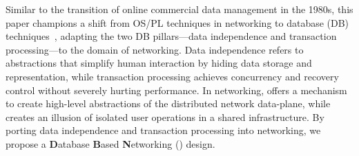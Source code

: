 Similar to the transition of online commercial data management in the
1980s, this paper champions a shift from OS/PL techniques in
networking to database (DB)
techniques~\cite{Abiteboul:1995:alice,db-concept,db-meta}, adapting
the two DB pillars---data independence and transaction processing---to
the domain of networking. Data independence refers to abstractions
that simplify human interaction by hiding data storage and
representation, while transaction processing achieves concurrency and
recovery control without severely hurting performance.  In networking,
\TI offers a mechanism to create high-level abstractions of the
distributed network data-plane, while \TR creates an illusion of
isolated user operations in a shared infrastructure.  By porting data
independence and transaction processing into networking, we propose a
\textbf{D}atabase \textbf{B}ased \textbf{N}etworking (\Sys) design.



